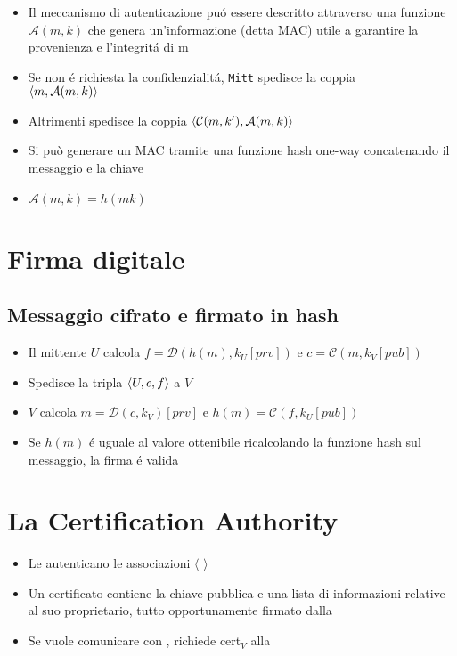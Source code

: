 \begin{itemize}
    \item Il meccanismo di autenticazione pu\'o essere descritto attraverso una funzione $\mathcal{A}(m, k)$ che genera un'informazione (detta MAC) utile a garantire la provenienza e l'integrit\'a di m
    \item Se non \'e richiesta la confidenzialit\'a, \texttt{Mitt} spedisce la coppia\\$\langle m, \mathcal{A}(m, k)\rangle$
    \item Altrimenti spedisce la coppia $\langle\mathcal{C}(m, k'), \mathcal{A}(m, k)\rangle$
    \item Si pu\`o generare un MAC tramite una funzione hash one-way concatenando il messaggio e la chiave
    \item $\mathcal{A}(m, k) = h(mk)$
\end{itemize}

\section{Firma digitale}

\subsection{Messaggio cifrato e firmato in hash}

\begin{itemize}
    \item Il mittente $U$ calcola $f = \mathcal{D}(h(m), k_U[prv])$ e $c = \mathcal{C}(m, k_V[pub])$
    \item Spedisce la tripla $\langle U, c, f\rangle$ a $V$
    \item $V$ calcola $m = \mathcal{D}(c, k_V)[prv]$ e $h(m) = \mathcal{C}(f, k_U[pub])$
    \item Se $h(m)$ \'e uguale al valore ottenibile ricalcolando la funzione hash sul messaggio, la firma \'e valida
\end{itemize}

\section{La Certification Authority}

\begin{itemize}
    \item Le  autenticano le associazioni $\langle$  $\rangle$
    \item Un certificato contiene la chiave pubblica e una lista di informazioni relative al suo proprietario, tutto opportunamente firmato dalla 
    \item Se  vuole comunicare con , richiede cert$_V$ alla 
\end{itemize}


